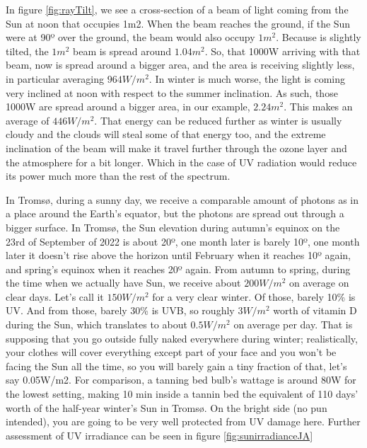 In figure \ref{fig:rayTilt}, we see a cross-section of a beam of light coming from the Sun at noon that occupies 1m2. When the beam reaches the ground, if the Sun were at 90º over the ground, the beam would also occupy $1m^2$. Because is slightly tilted, the $1m^2$ beam is spread around $1.04m^2$. So, that 1000W arriving with that beam, now is spread around a bigger area, and the area is receiving slightly less, in particular averaging $964W/m^2$. In winter is much worse, the light is coming very inclined at noon with respect to the summer inclination. As such, those 1000W are spread around a bigger area, in our example, $2.24m^2$. This makes an average of $446W/m^2$. That energy can be reduced further as winter is usually cloudy and the clouds will steal some of that energy too, and the extreme inclination of the beam will make it travel further through the ozone layer and the atmosphere for a bit longer. Which in the case of UV radiation would reduce its power much more than the rest of the spectrum.

In Tromsø, during a sunny day, we receive a comparable amount of photons as in a place around the Earth's equator, but the photons are spread out through a bigger surface. In Tromsø, the Sun elevation during autumn's equinox on the 23rd of September of 2022 is about 20º, one month later is barely 10º, one month later it doesn't rise above the horizon until February when it reaches 10º again, and spring's equinox when it reaches 20º again. From autumn to spring, during the time when we actually have Sun, we receive about $200W/m^2$ on average on clear days. Let's call it $150W/m^2$ for a very clear winter. Of those, barely 10\% is UV. And from those, barely 30\% is UVB, so  roughly $3W/m^2$ worth of vitamin D during the Sun, which translates to about $0.5W/m^2$ on average per day. That is supposing that you go outside fully naked everywhere during winter; realistically, your clothes will cover everything except part of your face and you won't be facing the Sun all the time, so you will barely gain a tiny fraction of that, let's say 0.05W/m2. For comparison, a tanning bed bulb's wattage is around 80W for the lowest setting, making 10 min inside a tannin bed the equivalent of 110 days' worth of the half-year winter's Sun in Tromsø. On the bright side (no pun intended), you are going to be very well protected from UV damage here. Further assessment of UV irradiance can be seen in figure \ref{fig:sunirradianceJA}

